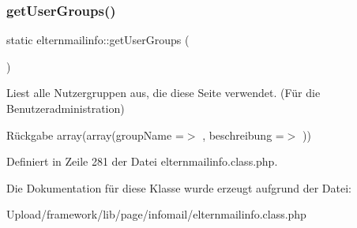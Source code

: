 \subsubsection{\texorpdfstring{get\+User\+Groups()}{getUserGroups()}}
{\footnotesize\ttfamily static elternmailinfo\+::get\+User\+Groups (\begin{DoxyParamCaption}{ }\end{DoxyParamCaption})\hspace{0.3cm}{\ttfamily [static]}}

Liest alle Nutzergruppen aus, die diese Seite verwendet. (Für die Benutzeradministration) \begin{DoxyReturn}{Rückgabe}
array(array(\textquotesingle{}group\+Name\textquotesingle{} =$>$ \textquotesingle{}\textquotesingle{}, \textquotesingle{}beschreibung\textquotesingle{} =$>$ \textquotesingle{}\textquotesingle{})) 
\end{DoxyReturn}


Definiert in Zeile 281 der Datei elternmailinfo.\+class.\+php.



Die Dokumentation für diese Klasse wurde erzeugt aufgrund der Datei\+:\begin{DoxyCompactItemize}
\item 
Upload/framework/lib/page/infomail/elternmailinfo.\+class.\+php\end{DoxyCompactItemize}
